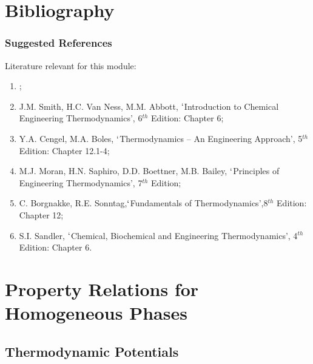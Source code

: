 \documentclass[10pt,compress,unknownkeysallowed]{beamer}
\begin{document}
\section{Bibliography}
\begin{frame}
 \frametitle{Suggested References}
  Literature relevant for this module:
  \begin{enumerate}[1.]
   \item {};
   \item\label{SVN_Book} J.M. Smith, H.C. Van Ness, M.M. Abbott, $\lq$Introduction to Chemical Engineering Thermodynamics', 6$^{th}$ Edition: Chapter 6;
   \item Y.A. Cengel, M.A. Boles, $\lq$Thermodynamics -- An Engineering Approach', 5$^{th}$ Edition: Chapter 12.1-4; 
   \item M.J. Moran, H.N. Saphiro, D.D. Boettner, M.B. Bailey, $\lq$Principles of Engineering Thermodynamics', 7$^{th}$ Edition; 
   \item C. Borgnakke, R.E. Sonntag,$\lq$Fundamentals of Thermodynamics',8$^{th}$ Edition: Chapter 12;
   \item S.I. Sandler, $\lq$Chemical, Biochemical and Engineering Thermodynamics', 4$^{th}$ Edition: Chapter 6.
  \end{enumerate} 
\end{frame}


\section{Property Relations for Homogeneous Phases}

\subsection{Thermodynamic Potentials} 
\end{document}
